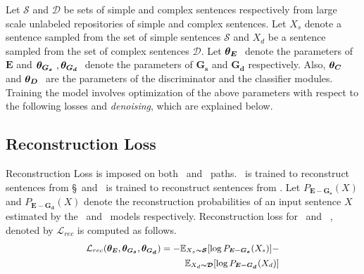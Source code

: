 \documentclass[11pt,a4paper]{article}
\begin{document}
Let $\boldsymbol{\mathcal{S}}$ and $\boldsymbol{\mathcal{D}}$ be sets of simple and complex sentences respectively from large scale  unlabeled repositories of simple and complex sentences. Let $X_s$ denote a sentence sampled from the set of simple sentences $\boldsymbol{\mathcal{S}}$ and $X_d$ be a sentence sampled from the set of complex sentences $\boldsymbol{\mathcal{D}}$.
Let $\boldsymbol{\theta_E}\ $ denote the parameters of $\boldsymbol{E}$ and $\boldsymbol{\theta_{G_s}}\ , \boldsymbol{\theta_{G_d}}\ $ denote the parameters of $\boldsymbol{G_s}$ and $\boldsymbol{G_d}$ respectively. Also, $\boldsymbol{\theta_{C}}\ $ and $\boldsymbol{\theta_{D}}\ $ are the parameters of the discriminator and the classifier modules.
Training the model involves optimization of the above parameters with respect to the following losses and \textit{denoising}, which are explained below.

\subsection{Reconstruction Loss}
\label{sec:reconst}
Reconstruction Loss is imposed on both \simplf\ and \compl\ paths. \simplf\ is trained to reconstruct sentences from \S\ and \compl\ is trained to reconstruct sentences from \D. 
Let $P_{\boldsymbol{E-G_s}}({X})$ and $P_{\boldsymbol{E-G_d}}(X)$ denote the reconstruction probabilities of an input sentence $X$ estimated by the \simplf\ and \compl\ models respectively. Reconstruction loss for \simplf\ and \compl\ , denoted by $\mathcal{L}_{rec}$ is computed as follows.
\begin{align}
\small
 \mathcal{L}_{rec}(\boldsymbol{\theta_E},\boldsymbol{\theta_{G_s}},\boldsymbol{\theta_{G_d}}) = -\mathbb{E}_{X_s\boldsymbol{ \sim  \mathcal{S}}}[\log{P_{\boldsymbol{E-G_s}}(X_s)}] - \nonumber \\
\small
 \mathbb{E}_{X_d\boldsymbol{ \sim  \mathcal{D}}}[\log{P_{\boldsymbol{E-G_d}}(X_d)}]
\label{eqn:reconst}
\end{align}
\end{document}

